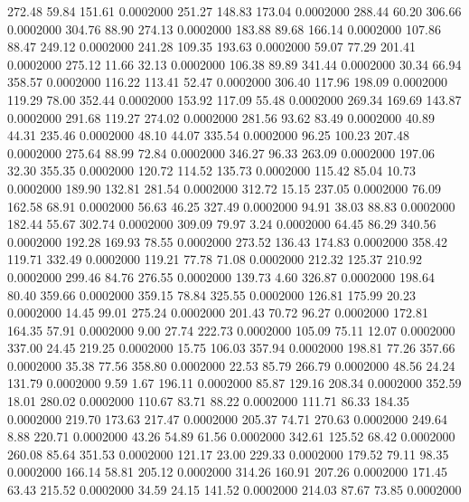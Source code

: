  272.48   59.84  151.61   0.0002000
 251.27  148.83  173.04   0.0002000
 288.44   60.20  306.66   0.0002000
 304.76   88.90  274.13   0.0002000
 183.88   89.68  166.14   0.0002000
 107.86   88.47  249.12   0.0002000
 241.28  109.35  193.63   0.0002000
  59.07   77.29  201.41   0.0002000
 275.12   11.66   32.13   0.0002000
 106.38   89.89  341.44   0.0002000
  30.34   66.94  358.57   0.0002000
 116.22  113.41   52.47   0.0002000
 306.40  117.96  198.09   0.0002000
 119.29   78.00  352.44   0.0002000
 153.92  117.09   55.48   0.0002000
 269.34  169.69  143.87   0.0002000
 291.68  119.27  274.02   0.0002000
 281.56   93.62   83.49   0.0002000
  40.89   44.31  235.46   0.0002000
  48.10   44.07  335.54   0.0002000
  96.25  100.23  207.48   0.0002000
 275.64   88.99   72.84   0.0002000
 346.27   96.33  263.09   0.0002000
 197.06   32.30  355.35   0.0002000
 120.72  114.52  135.73   0.0002000
 115.42   85.04   10.73   0.0002000
 189.90  132.81  281.54   0.0002000
 312.72   15.15  237.05   0.0002000
  76.09  162.58   68.91   0.0002000
  56.63   46.25  327.49   0.0002000
  94.91   38.03   88.83   0.0002000
 182.44   55.67  302.74   0.0002000
 309.09   79.97    3.24   0.0002000
  64.45   86.29  340.56   0.0002000
 192.28  169.93   78.55   0.0002000
 273.52  136.43  174.83   0.0002000
 358.42  119.71  332.49   0.0002000
 119.21   77.78   71.08   0.0002000
 212.32  125.37  210.92   0.0002000
 299.46   84.76  276.55   0.0002000
 139.73    4.60  326.87   0.0002000
 198.64   80.40  359.66   0.0002000
 359.15   78.84  325.55   0.0002000
 126.81  175.99   20.23   0.0002000
  14.45   99.01  275.24   0.0002000
 201.43   70.72   96.27   0.0002000
 172.81  164.35   57.91   0.0002000
   9.00   27.74  222.73   0.0002000
 105.09   75.11   12.07   0.0002000
 337.00   24.45  219.25   0.0002000
  15.75  106.03  357.94   0.0002000
 198.81   77.26  357.66   0.0002000
  35.38   77.56  358.80   0.0002000
  22.53   85.79  266.79   0.0002000
  48.56   24.24  131.79   0.0002000
   9.59    1.67  196.11   0.0002000
  85.87  129.16  208.34   0.0002000
 352.59   18.01  280.02   0.0002000
 110.67   83.71   88.22   0.0002000
 111.71   86.33  184.35   0.0002000
 219.70  173.63  217.47   0.0002000
 205.37   74.71  270.63   0.0002000
 249.64    8.88  220.71   0.0002000
  43.26   54.89   61.56   0.0002000
 342.61  125.52   68.42   0.0002000
 260.08   85.64  351.53   0.0002000
 121.17   23.00  229.33   0.0002000
 179.52   79.11   98.35   0.0002000
 166.14   58.81  205.12   0.0002000
 314.26  160.91  207.26   0.0002000
 171.45   63.43  215.52   0.0002000
  34.59   24.15  141.52   0.0002000
 214.03   87.67   73.85   0.0002000

